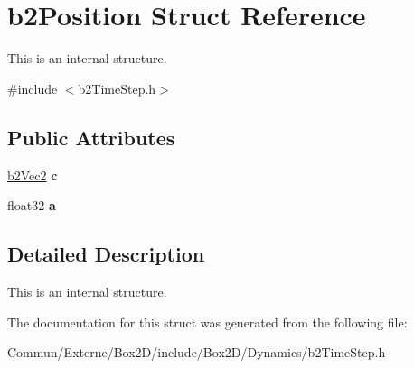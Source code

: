 \hypertarget{structb2_position}{}\section{b2\+Position Struct Reference}
\label{structb2_position}


This is an internal structure.  




{\ttfamily \#include $<$b2\+Time\+Step.\+h$>$}

\subsection*{Public Attributes}
\begin{DoxyCompactItemize}
\item 
\hyperlink{structb2_vec2}{b2\+Vec2} {\bfseries c}\hypertarget{structb2_position_a64b6d764d272385f84e4cac5ceb5af27}{}\label{structb2_position_a64b6d764d272385f84e4cac5ceb5af27}

\item 
float32 {\bfseries a}\hypertarget{structb2_position_a19d9362011e8c080059ac7f692cc7d8f}{}\label{structb2_position_a19d9362011e8c080059ac7f692cc7d8f}

\end{DoxyCompactItemize}


\subsection{Detailed Description}
This is an internal structure. 

The documentation for this struct was generated from the following file\+:\begin{DoxyCompactItemize}
\item 
Commun/\+Externe/\+Box2\+D/include/\+Box2\+D/\+Dynamics/b2\+Time\+Step.\+h\end{DoxyCompactItemize}

